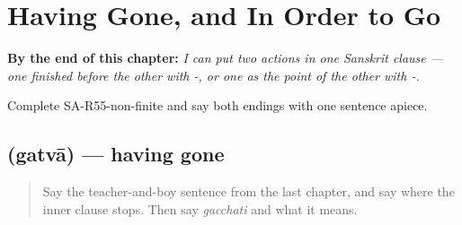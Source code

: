 
\chapter{Having Gone, and In Order to Go}
\label{ch:sa-having-gone}

\begin{chapteropening}
\textbf{By the end of this chapter:} \emph{I can put two actions in one Sanskrit clause — one finished before the other with -, or one as the point of the other with -.}

Complete SA-R55-non-finite and say both endings with one sentence apiece.
\end{chapteropening}

\section[\texorpdfstring{\sk{गत्वा} (gatvā)}{गत्वा (gatvā)}]{ (gatvā) — having gone}

\label{lesson:SA-C55-gatva}



\begin{quote}
Say the teacher-and-boy sentence from the last chapter, and say where the inner clause stops. Then say \emph{gacchati} and what it means.
\end{quote}

